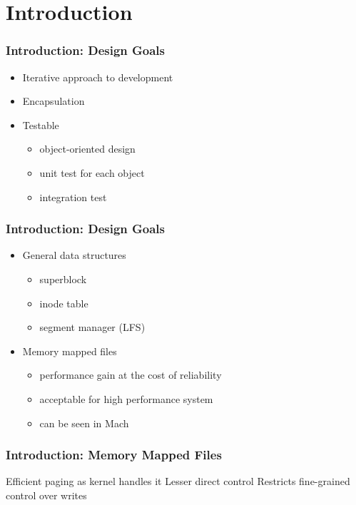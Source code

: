 \section{Introduction}

\begin{frame}
\frametitle{Introduction: Design Goals}
	\begin{itemize}[<+->]
	\setlength\itemsep{1em}
	\item Iterative approach to development
	\item Encapsulation
	\item Testable
		\begin{itemize}
			\item object-oriented design
			\item unit test for each object
			\item integration test
		\end{itemize}
\end{itemize}
\end{frame}

\begin{frame}
	\frametitle{Introduction: Design Goals \continued}
	\begin{itemize}[<+->]
		\setlength\itemsep{1em}
		\item General data structures
			\begin{itemize}
				\item superblock
				\item inode table
				\item segment manager (LFS)
			\end{itemize}
		\item Memory mapped files
			\begin{itemize}
				\item performance gain at the cost of reliability
				\item acceptable for high performance system
				\item can be seen in Mach
			\end{itemize}
	\end{itemize}
\end{frame}

\begin{frame}
	\frametitle{Introduction: Memory Mapped Files}
	\begin{itemize}[<+->]
		\setlength\itemsep{1em}
		\pro Efficient paging as kernel handles it
		\con Lesser direct control
		\con Restricts fine-grained control over writes
	\end{itemize}
\end{frame}

